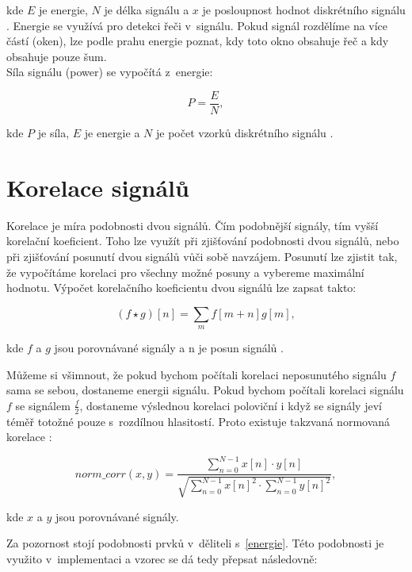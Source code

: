 kde $E$ je energie, $N$ je délka signálu a $x$ je posloupnost hodnot diskrétního signálu \cite{energie}. Energie se využívá pro detekci řeči v~signálu. Pokud signál rozdělíme na více částí (oken), lze podle prahu energie poznat, kdy toto okno obsahuje řeč a kdy obsahuje pouze šum.
\\

Síla signálu (power) se vypočítá z~energie:

\begin{equation}
	P=\frac{E}{N},
	\label{power}
\end{equation}

kde $P$ je síla, $E$ je energie a $N$ je počet vzorků diskrétního signálu \cite{energie}.


\section{Korelace signálů}

Korelace je míra podobnosti dvou signálů. Čím podobnější signály, tím vyšší korelační koeficient. Toho lze využít při zjišťování podobnosti dvou signálů, nebo při zjišťování posunutí dvou signálů vůči sobě navzájem. Posunutí lze zjistit tak, že vypočítáme korelaci pro všechny možné posuny a vybereme maximální hodnotu. Výpočet korelačního koeficientu dvou signálů lze zapsat takto:

\begin{equation}
	(f \star g)[n]=\sum_{m}f[m+n]g[m],
	\label{korelace}
\end{equation}

kde $f$ a $g$ jsou porovnávané signály a n je posun signálů \cite{korelace}.

Můžeme si všimnout, že pokud bychom počítali korelaci neposunutého signálu $f$ sama se sebou, dostaneme energii signálu. Pokud bychom počítali korelaci signálu $f$ se signálem $\frac{f}{2}$, dostaneme výslednou korelaci poloviční i když se signály jeví téměř totožné pouze s~rozdílnou hlasitostí. Proto existuje takzvaná normovaná korelace \cite{normcorel}:

\begin{equation}
norm\_corr(x,y)=\frac{\sum_{n=0}^{N-1} x[n]\cdot y[n]}{\sqrt{\sum_{n=0}^{N-1} x[n]^2 \cdot \sum_{n=0}^{N-1} y[n]^2}}
	\label{norm_korelace},
\end{equation}

kde $x$ a $y$ jsou porovnávané signály.

Za pozornost stojí podobnosti prvků v~děliteli s~\ref{energie}. Této podobnosti je využito v~implementaci a vzorec se dá tedy přepsat následovně:

